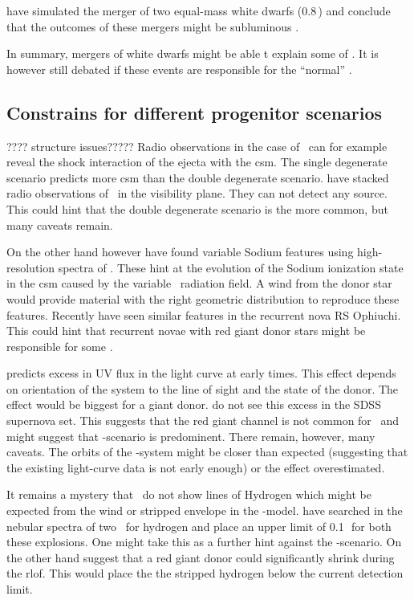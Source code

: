 \cite{2010Natur.463...61P} have simulated the merger of two equal-mass white dwarfs (0.8\,\msun) and conclude that the outcomes of these mergers might be subluminous \sneia.

In summary, mergers of white dwarfs might be able t explain some of \snia. It is however still debated if these events are responsible for the ``normal'' \sneia. 

\subsection{Constrains for different progenitor scenarios}
???? structure issues?????
Radio observations in the case of \sneia\ can for example reveal the shock interaction of the ejecta with the \gls{csm}. The single degenerate scenario predicts more \gls{csm} than the double degenerate scenario. \citet{2011arXiv1105.6188H} have stacked radio observations of \sneia\ in the visibility plane. They can not detect any source. This could hint that the double degenerate scenario is the more common, but many caveats remain.

On the other hand however \cite{2007Sci...317..924P} have found variable Sodium features using high-resolution spectra of \sneia. These hint at the evolution of the Sodium ionization state in the \gls{csm} caused by the variable \snia\ radiation field. A wind from the donor star would provide material with the right geometric distribution to reproduce these features. Recently \cite{2011A&A...530A..63P} have seen similar features in the recurrent nova RS Ophiuchi. This could hint that recurrent novae with red giant donor stars might be responsible for some \sneia. 


\cite{2010ApJ...708.1025K} predicts excess in UV flux in the \snia light curve at early times. This effect depends on orientation of the system to the line of sight and the state of the donor. The effect would be biggest for a giant donor. \cite{2010ApJ...722.1691H} do not see this excess in the SDSS supernova set. This suggests that the red giant channel is not common for \sneia\ and might suggest that \dd-scenario is predominent. There remain, however, many caveats. The orbits of the \sd-system might be closer than expected (suggesting that the existing light-curve data is not early enough) or the effect overestimated.

It remains a mystery that \sneia\ do not show lines of Hydrogen which might be expected from the wind or stripped envelope in the \sd-model. \citet{2007ApJ...670.1275L} have searched in the nebular spectra of two \sneia\ for hydrogen and place an upper limit of 0.1\,\msun\ for both these explosions. One might take this as a further hint against the \sd-scenario. On the other hand \citet{2011ApJ...730L..34J} suggest that a red giant donor could significantly shrink during the \gls{rlof}. This would place the the stripped hydrogen below the current detection limit. 

